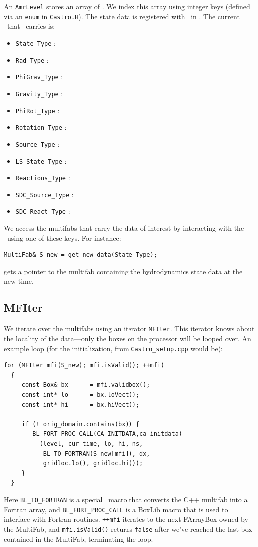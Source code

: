 An {\tt AmrLevel} stores an array of \statedata.  We index this array
using integer keys (defined via an {\tt enum} in {\tt Castro.H}).  
The state data is registered with \boxlib\ in .
The current \statedata\ that \castro\ carries is:
\begin{itemize}
\item {\tt State\_Type} :
\item {\tt Rad\_Type} :
\item {\tt PhiGrav\_Type} :
\item {\tt Gravity\_Type} :
\item {\tt PhiRot\_Type} :
\item {\tt Rotation\_Type} :
\item {\tt Source\_Type} :
\item {\tt LS\_State\_Type} :
\item {\tt Reactions\_Type} :
\item {\tt SDC\_Source\_Type} :
\item {\tt SDC\_React\_Type} :
\end{itemize}

We access the multifabs that carry the data of interest by interacting
with the \statedata\ using one of these keys.  For instance:
\begin{lstlisting}
MultiFab& S_new = get_new_data(State_Type);
\end{lstlisting}
gets a pointer to the multifab containing the hydrodynamics state data
at the new time.




\subsection{MFIter}

We iterate over the multifabs using an iterator {\tt MFIter}.  This
iterator knows about the locality of the data---only the boxes on the
processor will be looped over.  An example loop (for the
initialization, from {\tt Castro\_setup.cpp} would be):
\begin{lstlisting}
for (MFIter mfi(S_new); mfi.isValid(); ++mfi)
  {
     const Box& bx      = mfi.validbox();
     const int* lo      = bx.loVect();
     const int* hi      = bx.hiVect();

     if (! orig_domain.contains(bx)) {
        BL_FORT_PROC_CALL(CA_INITDATA,ca_initdata)
          (level, cur_time, lo, hi, ns,
           BL_TO_FORTRAN(S_new[mfi]), dx,
           gridloc.lo(), gridloc.hi());
     }
  }
\end{lstlisting}
Here {\tt BL\_TO\_FORTRAN} is a special \boxlib\ macro that converts the
C++ multifab into a Fortran array, and {\tt BL\_FORT\_PROC\_CALL}
is a BoxLib macro that is used to interface with Fortran routines.
{\tt ++mfi} iterates to the next FArrayBox owned by the MultiFab,
and {\tt mfi.isValid()} returns {\tt false} after we've reached
the last box contained in the MultiFab, terminating the loop.

